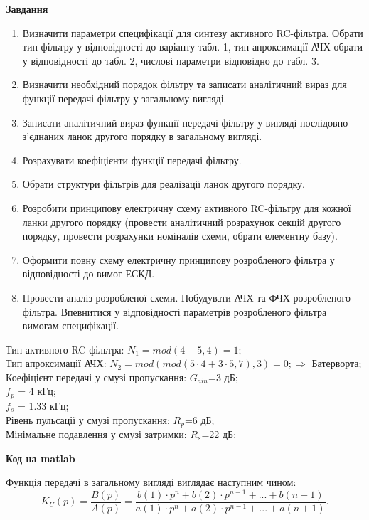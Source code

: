 \documentclass[a4paper,14pt]{extreport}
\begin{document}
\begin{center}\textbf{Завдання}\end{center}\par
\begin{enumerate}
	\item Визначити параметри специфікації для синтезу активного RC-фільтра. Обрати тип
	фільтру у відповідності до варіанту табл. 1, тип апроксимації АЧХ обрати у відповідності
	до табл. 2, числові параметри відповідно до табл. 3.
	\item  Визначити необхідний порядок фільтру та записати аналітичний вираз для функції
	передачі фільтру у загальному вигляді.
	\item  Записати аналітичний вираз функції передачі фільтру у вигляді послідовно з’єднаних
	ланок другого порядку в загальному вигляді.
	\item  Розрахувати коефіцієнти функції передачі фільтру.
	\item  Обрати структури фільтрів для реалізації ланок другого порядку.
	\item  Розробити принципову електричну схему активного RC-фільтру для кожної ланки другого
	порядку (провести аналітичний розрахунок секцій другого порядку, провести розрахунки
	номіналів схеми, обрати елементну базу).
	\item  Оформити повну схему електричну принципову розробленого фільтра у відповідності до
	вимог ЕСКД.
	\item  Провести аналіз розробленої схеми. Побудувати АЧХ та ФЧХ розробленого фільтра.
	Впевнитися у відповідності параметрів розробленого фільтра вимогам специфікації.
\end{enumerate}
\newpage

\begin{center}
\end{center}
	Тип активного RC-фільтра: $ N_1 = mod(4+5,4) = 1$;\\
	Тип апроксимації АЧХ: $N_2 = mod(mod(5\cdot 4+3\cdot 5, 7), 3) = 0; \Rightarrow $  Батерворта;\\
	Коефіцієнт передачі у смузі пропускання: $G_{ain}$=3 дБ;\\
	$f_p$ = 4 кГц;\\
	$f_s$ = 1.33 кГц;\\
	Рівень пульсації у смузі пропускання: $R_p$=6 дБ;\\
	Мінімальне подавлення у смузі затримки: $R_s$=22 дБ;\\

\begin{center}
\end{center}
	\begin{center}
	\textbf{Код на matlab}
	\end{center}
	
\newpage
Функція передачі в загальному вигляді виглядає наступним чином:
\begin{equation}
K_U(p)=\dfrac{B(p)}{A(p)}=\dfrac{b(1)\cdot p^n+b(2)\cdot p^{n-1}+...+b(n+1)}{a(1)\cdot p^n+a(2)\cdot p^{n-1}+...+a(n+1)}.
\end{equation}
\end{document}
